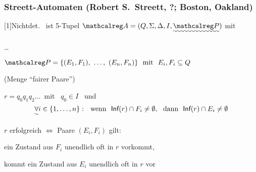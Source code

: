     \begin{frame}[t]
      \frametitle{Streett-Automaten \hfill {\footnotesize (Robert S.\ Streett, ?; Boston, Oakland)}}

      \begin{Definition}{}
        \scalebox{.96}[1]{Nichtdet.\  ist 5-$\!$Tupel $\Aut{A} = (Q, \Sigma, \Delta, I, \Uwave{\calP})$ mit}
        \begin{Itemize}
          \item
            \dots
          \item
            $\calP = \{(E_1,F_1),~\dots,~(E_n,F_n)\} \text{~~mit~~} E_i,F_i \subseteq Q$
            \par\smallskip
            (Menge "`fairer Paare"')
        \end{Itemize}
        \par\medskip
         $r = q_0q_1q_2\dots$~mit~
        $q_0 \in I$ ~und
        \[
          \Uwave{\forall} i \in\{1,\dots,n\}:
          \text{~~wenn~~}
          \Inf(r) \cap F_i \neq \emptyset,
          \text{~~dann~~}
          \Inf(r) \cap E_i \neq \emptyset
        \]
        \vspace*{-22pt}
      \end{Definition}

      \par\bigskip
       $r$ erfolgreich $\Leftrightarrow$  Paare $(E_i,F_i)$ gilt:
      \begin{Itemize}
        \item
           ein Zustand aus $F_i$ unendlich oft in $r$ vorkommt,
        \item
           kommt ein Zustand aus $E_i$ unendlich oft in $r$ vor
          \Tafel
      \end{Itemize}

    \end{frame}

